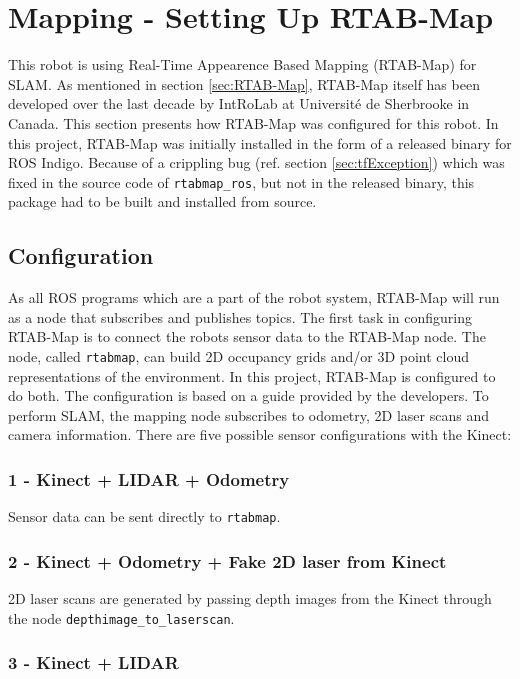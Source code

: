 \section{Mapping - Setting Up RTAB-Map}

This robot is using Real-Time Appearence Based Mapping (\ac{RTAB-Map}) for \ac{SLAM}. As mentioned in section \ref{sec:RTAB-Map}, \ac{RTAB-Map} itself has been developed over the last decade by IntRoLab at Université de Sherbrooke in Canada. This section presents how \ac{RTAB-Map} was configured for this robot. In this project, \ac{RTAB-Map} was initially installed in the form of a released binary for \ac{ROS} Indigo. Because of a crippling bug (ref. section \ref{sec:tfException}) which was fixed in the source code
of \texttt{rtabmap\_ros}, but not in the released binary, this package had to be built and installed from source.

\subsection{Configuration}
\label{sec:configuration}
As all \ac{ROS} programs which are a part of the robot system, \ac{RTAB-Map} will run as a node that subscribes and publishes topics. The first task in configuring \ac{RTAB-Map} is to connect the robots sensor data to the \ac{RTAB-Map} node. The node, called \texttt{rtabmap}, can build 2D occupancy grids and/or 3D point cloud representations of the environment. In this project, \ac{RTAB-Map} is configured to do both. The configuration is based on a guide\cite{rtabmap_setup} provided by the developers. To perform \ac{SLAM}, the mapping node subscribes to odometry, 2D laser scans and camera information. There are five possible sensor configurations with the Kinect\cite{rtabmap_setup}:

\subsubsection{1 - Kinect + LIDAR + Odometry} 
Sensor data can be sent directly to \texttt{rtabmap}.

\subsubsection{2 - Kinect + Odometry + Fake 2D laser from Kinect}

2D laser scans are generated by passing depth images from the Kinect through the node \texttt{depthimage\_to\_laserscan}.

\subsubsection{3 - Kinect + LIDAR}

